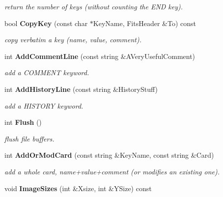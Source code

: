 \begin{CompactItemize}
\begin{CompactList}\small\item\em return the number of keys (without counting the END key).\item\end{CompactList}\item 
{}
bool {\bf Copy\-Key} (const char $\ast$Key\-Name, Fits\-Header \&To) const\label{class_fitsheader_a29}

\begin{CompactList}\small\item\em copy verbatim a key (name, value, comment).\item\end{CompactList}\item 
int {\bf Add\-Comment\-Line} (const string \&AVery\-Useful\-Comment)
\begin{CompactList}\small\item\em add a COMMENT keyword.\item\end{CompactList}\item 
int {\bf Add\-History\-Line} (const string \&History\-Stuff)
\begin{CompactList}\small\item\em add a HISTORY keyword.\item\end{CompactList}\item 
{}
int {\bf Flush} ()\label{class_fitsheader_a32}

\begin{CompactList}\small\item\em flush file buffers.\item\end{CompactList}\item 
{}
int {\bf Add\-Or\-Mod\-Card} (const string \&Key\-Name, const string \&Card)\label{class_fitsheader_a33}

\begin{CompactList}\small\item\em add a whole card, name+value+comment (or modifies an existing one).\item\end{CompactList}\item 
{}
void {\bf Image\-Sizes} (int \&Xsize, int \&YSize) const\label{class_fitsheader_a34}


\end{CompactItemize}
